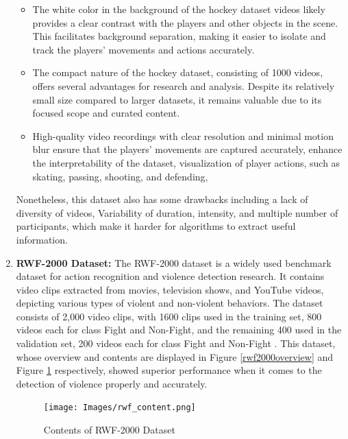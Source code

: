 \begin{enumerate}
    \begin{itemize}
        \item The white color in the background of the hockey dataset videos likely provides a clear contrast with the players and other objects in the scene. This facilitates background separation, making it easier to isolate and track the players' movements and actions accurately.
        \item The compact nature of the hockey dataset, consisting of 1000 videos, offers several advantages for research and analysis. Despite its relatively small size compared to larger datasets, it remains valuable due to its focused scope and curated content.
        \item High-quality video recordings with clear resolution and minimal motion blur ensure that the players' movements are captured accurately, enhance the interpretability of the dataset, visualization of player actions, such as skating, passing, shooting, and defending, 
    \end{itemize}
    

     Nonetheless, this dataset also has some drawbacks including a lack of diversity of videos\cite{ourdataset}, Variability of duration, intensity, and multiple number of participants, which make it harder for algorithms to extract useful information.

    \item \textbf{RWF-2000 Dataset:}
    The RWF-2000 dataset is a widely used benchmark dataset for action recognition and violence detection research. It contains video clips extracted from movies, television shows, and YouTube videos, depicting various types of violent and non-violent behaviors. The dataset consists of 2,000 video clips, with 1600 clips used in the training set, 800 videos each for class Fight and Non-Fight, and the remaining 400 used in the validation set, 200 videos each for class Fight and Non-Fight \cite{ourdataset}. This dataset, whose overview and contents are displayed in Figure \ref{rwf2000overview} and Figure \ref{rwf2000content} respectively, showed superior performance when it comes to the detection of violence properly and accurately.
    
    \begin{figure}[h!]
        \centering
        \texttt{[image: Images/rwf\_content.png]}
        \caption{Contents of RWF-2000 Dataset}
        \label{rwf2000content}
    \end{figure}

    

\end{enumerate}
